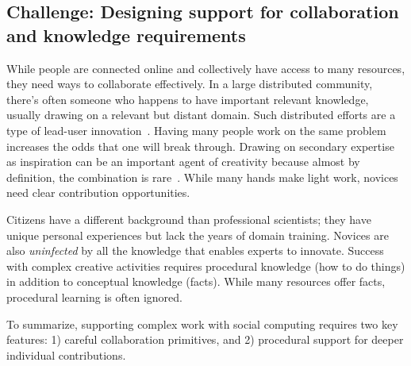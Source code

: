 \subsection{Challenge: Designing support for collaboration and knowledge requirements}
While people are connected online and collectively have access to many resources, they need ways to collaborate effectively. 
In a large distributed community, there’s often someone who happens to 
have important relevant knowledge, usually drawing on a relevant but 
distant domain. Such distributed efforts are a type of lead-user innovation~\cite{VonHippel2005a}. 
Having many people work on the same problem increases the odds that 
one will break through. Drawing on secondary expertise as inspiration can
 be an important agent of creativity because almost by definition, the 
combination is rare~\cite{Boden2004}. While many hands make light work, novices need clear contribution opportunities. 

Citizens have a different background than professional scientists; they have unique
 personal experiences but lack the years of domain training. Novices are also
\textit{uninfected} by all the knowledge that enables experts to
innovate. Success with complex creative activities requires procedural
knowledge (how to do things) in addition to conceptual
knowledge (facts). While many resources offer facts, procedural
learning is often ignored. 




To summarize, supporting complex work with social computing requires two key features: 
1) careful collaboration primitives, and 2) procedural support for deeper individual contributions.


